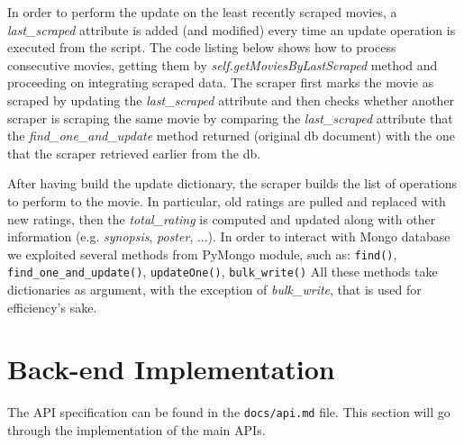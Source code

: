 \documentclass[11pt]{article}
\begin{document}
In order to perform the update on the least recently scraped movies, a \emph{last\_scraped} attribute is added (and modified) every time an update operation is executed from the script. The code listing below shows how to process consecutive movies, getting them by \emph{self.\-get\-Movies\-By\-Last\-Scraped} method and proceeding on integrating scraped data.
The scraper first marks the movie as scraped by updating the \emph{last\_scraped} attribute and then checks whether another scraper is scraping the same movie by comparing the \emph{last\_scraped} attribute that the \emph{find\_one\_and\_update} method returned (original db document) with the one that the scraper retrieved earlier from the db.

After having build the update dictionary, the scraper builds the list of operations to perform to the movie. In particular, old ratings are pulled and replaced with new ratings, then the \emph{total\_rating} is computed and updated along with other information (e.g. \emph{synopsis}, \emph{poster}, ...). In order to interact with Mongo database we exploited several methods from PyMongo module, such as: \texttt{find()}, \texttt{find\_one\_and\_update()}, \texttt{updateOne()}, \texttt{bulk\_write()}
All these methods take dictionaries as argument, with the exception of \emph{bulk\_write}, that is used for efficiency's sake.




\section{Back-end Implementation}
The API specification can be found in the \texttt{docs/api.md} file. This section will go through the implementation of the main APIs. 
\end{document}
